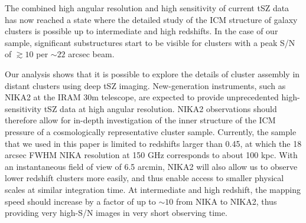 \documentclass[traditabstract]{aa}
\begin{document}
The combined high angular resolution and high sensitivity of current tSZ data has now reached a state where the detailed study of the ICM structure of galaxy clusters is possible up to intermediate and high redshifts. In the case of our sample, significant substructures start to be visible for clusters with a peak S/N of $\gtrsim 10$ per $\sim 22$ arcsec beam.

Our analysis shows that it is possible to explore the details of cluster assembly in distant clusters using deep tSZ imaging. New-generation instruments, such as NIKA2 \citep{Calvo2016,Catalano2016,NIKA2017} at the IRAM 30m telescope, are expected to provide unprecedented high-sensitivity tSZ data at high angular resolution. NIKA2 observations \citep[such as the ones of the tSZ large program,][]{Comis2016,Mayet2017} should therefore allow for in-depth investigation of the inner structure of the ICM pressure of a cosmologically representative cluster sample. Currently, the sample that we used in this paper is limited to redshifts larger than 0.45, at which the 18 arcsec FWHM NIKA resolution at 150 GHz corresponds to about 100 kpc. With an instantaneous field of view of 6.5 arcmin, NIKA2 will also allow us to observe lower redshift clusters more easily, and thus enable access to smaller physical scales at similar integration time. At intermediate and high redshift, the mapping speed should increase by a factor of up to $\sim 10$ from NIKA to NIKA2, thus providing very high-S/N images in very short observing time.
\end{document}
